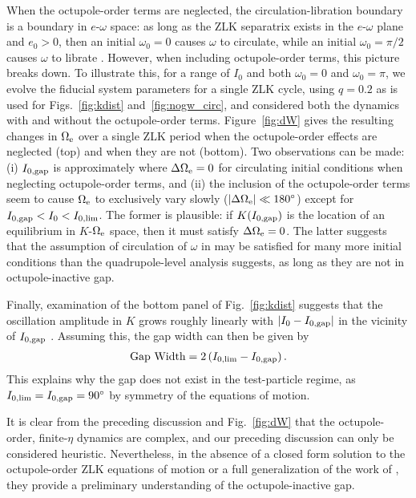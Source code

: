 \documentclass[
        fleqn,
        usenatbib,
    ]{mnras}
\newcommand*{\abs}[1]{\left|#1\right|}
\newcommand*{\p}[1]{\left(#1\right)}
\begin{document}
When the octupole-order terms are neglected, the circulation-libration
boundary is a boundary in $e$-$\omega$ space: as long as the ZLK separatrix
exists in the $e$-$\omega$ plane and $e_0 > 0$, then an initial $\omega_0 = 0$
causes $\omega$ to circulate, while an initial $\omega_0 = \pi/2$ causes
$\omega$ to librate \citep[e.g.,][]{kinoshita, shevchenko2016lidov}. However,
when including octupole-order terms, this picture breaks down. To illustrate
this, for a range of $I_0$ and both $\omega_0 = 0$ and $\omega_0 = \pi$, we
evolve the fiducial system parameters for a single ZLK cycle, using $q = 0.2$ as
is used for Figs.~\ref{fig:kdist} and~\ref{fig:nogw_circ}, and considered both
the dynamics with and without the octupole-order terms. Figure~\ref{fig:dW}
gives the resulting changes in $\Omega_{\rm e}$ over a single ZLK period when
the octupole-order effects are neglected (top) and when they are not (bottom).
Two observations can be made: (i) $I_{\rm 0, gap}$ is approximately where
$\Delta \Omega_{\rm e} = 0$ for circulating initial conditions when neglecting
octupole-order terms, and (ii) the inclusion of the octupole-order terms seem to
cause $\Omega_{\rm e}$ to exclusively vary slowly ($\abs{\Delta \Omega_{\rm e}}
\ll 180^\circ$) except for $I_{\rm 0, gap} < I_0 < I_{0, \lim}$. The former is
plausible: if $K(I_{\rm 0, gap})$ is the location of an equilibrium in
$K$-$\Omega_{\rm e}$ space, then it must satisfy $\Delta \Omega_{\rm e} = 0$.
The latter suggests that the assumption of circulation of $\omega$ in
\citet{katz2011long} may be satisfied for many more initial conditions than the
quadrupole-level analysis suggests, as long as they are not in octupole-inactive
gap.

Finally, examination of the bottom panel of Fig.~\ref{fig:kdist} suggests that
the oscillation amplitude in $K$ grows roughly linearly with $\abs{I_0 - I_{\rm
0, gap}}$ in the vicinity of $I_{\rm 0, gap}$ \citep[this may be because, in the
test-particle limit, librating $\omega$ give oscillation amplitudes in $K$ that
are higher-order in $K$ and $\Omega_{\rm e}$, as pointed out
by][]{katz2011long}. Assuming this, the gap width can then be given by
\begin{align}
    \text{Gap Width} = 2\p{I_{0, \lim} - I_{\rm 0, gap}}.
\end{align}
This explains why the gap does not exist in the test-particle regime, as $I_{0,
\lim} = I_{\rm 0, gap} = 90^\circ$ by symmetry of the equations of motion.

It is clear from the preceding discussion and Fig.~\ref{fig:dW} that the
octupole-order, finite-$\eta$ dynamics are complex, and our preceding
discussion can only be considered heuristic. Nevertheless, in the absence of a
closed form solution to the octupole-order ZLK equations of motion or a full
generalization of the work of \citet{katz2011long}, they provide a preliminary
understanding of the octupole-inactive gap.
\end{document}
